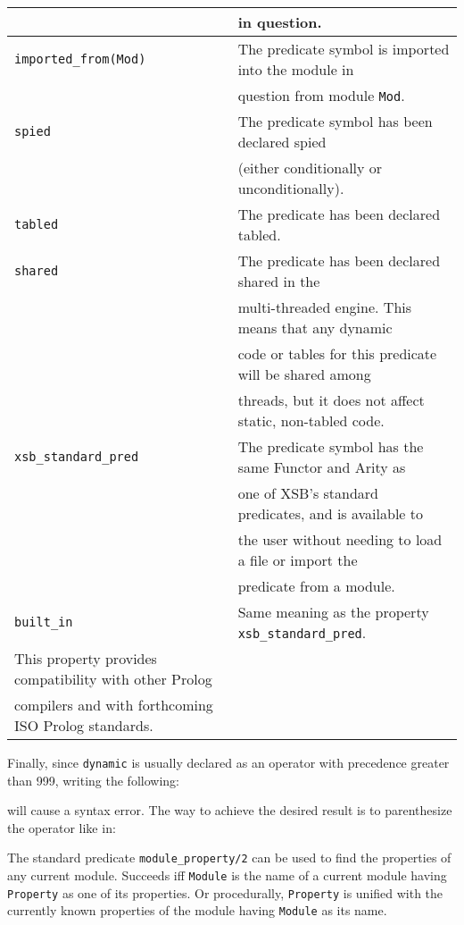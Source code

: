 \begin{description}
\begin{center}
\begin{tabular}{||l|l||}
	&	in question. \\ \hline
	{\tt imported\_from(Mod)}	& 
		The predicate symbol is imported into the module in \\
	&	question from module {\tt Mod}. \\ \hline
	\hline
	{\tt spied}		&
		The predicate symbol has been declared spied \\
	&	(either conditionally or unconditionally). \\ \hline
	\hline
	{\tt tabled}	& 
		The predicate has been declared tabled. \\ \hline
	\hline
	{\tt shared}	& 
		The predicate has been declared shared in the \\
        &       multi-threaded engine.  This means that any dynamic \\
        &       code or tables for this predicate will be shared among \\
        &       threads, but it does not affect static, non-tabled code. \\ \hline
	\hline
	{\tt xsb\_standard\_pred}	& 
		The predicate symbol has the same Functor and Arity as  \\
	&	one of XSB's standard predicates, and is available to \\
	&	the user without needing to load a file or import the \\
	&	predicate from a module. \\ \hline
	\hline
	{\tt built\_in}	& 
		Same meaning as the property {\tt xsb\_standard\_pred}. \\
		This property provides compatibility with other Prolog \\
		compilers and with forthcoming ISO Prolog standards. \\ \hline
    \end{tabular}
    \end{center}

    Finally, since {\tt dynamic} is usually declared as an operator with 
    precedence greater than 999, writing the following:


    will cause a syntax error. The way to achieve the desired result is to
    parenthesize the operator like in:



    The standard predicate {\tt module\_property/2} can be used to find the
    properties of any current module.
    Succeeds iff {\tt Module} is the name of a current module having 
    {\tt Property} as one of its properties. Or procedurally, {\tt Property}
    is unified with the currently known properties of the module having 
    {\tt Module} as its name.


\end{description}
